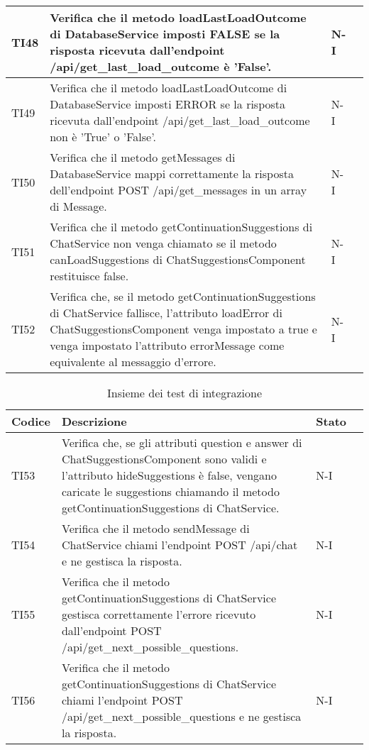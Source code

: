 \begin{table}[h!]
\begin{tabularx}{\textwidth}{|p{}|X|p{}|p{}|}
    TI48 & Verifica che il metodo loadLastLoadOutcome di DatabaseService imposti FALSE se la risposta ricevuta dall'endpoint /api/get\_last\_load\_outcome è 'False'. &  N-I \\ \hline
    TI49 & Verifica che il metodo loadLastLoadOutcome di DatabaseService imposti ERROR se la risposta ricevuta dall'endpoint /api/get\_last\_load\_outcome non è 'True' o 'False'. &  N-I \\ \hline
    TI50 & Verifica che il metodo getMessages di DatabaseService mappi correttamente la risposta dell'endpoint POST /api/get\_messages in un array di Message. &  N-I \\ \hline
    TI51 & Verifica che il metodo getContinuationSuggestions di ChatService non venga chiamato se il metodo canLoadSuggestions di ChatSuggestionsComponent restituisce false. &  N-I \\ \hline
    TI52 & Verifica che, se il metodo getContinuationSuggestions di ChatService fallisce, l'attributo loadError di ChatSuggestionsComponent venga impostato a true e venga impostato l'attributo errorMessage come equivalente al messaggio d'errore. &  N-I \\ \hline

    \end{tabularx}
\end{table}

\newpage

\begin{table}[h!]
    \centering
    \renewcommand{\arraystretch}{1.5}
    \begin{tabularx}{\textwidth}{|p{}|X|p{}|p{}|}\hline
    \rowcolor[HTML]{FFD700}
    \textbf{Codice} & \textbf{Descrizione} & \textbf{Stato} \\ \hline
    
    TI53 & Verifica che, se gli attributi question e answer di ChatSuggestionsComponent sono validi e l'attributo hideSuggestions è false, vengano caricate le suggestions chiamando il metodo getContinuationSuggestions di ChatService. &  N-I \\ \hline
    TI54 & Verifica che il metodo sendMessage di ChatService chiami l’endpoint POST /api/chat e ne gestisca la risposta. &  N-I \\ \hline
    TI55 & Verifica che il metodo getContinuationSuggestions di ChatService gestisca correttamente l'errore ricevuto dall'endpoint POST /api/get\_next\_possible\_questions. &  N-I \\ \hline
    TI56 & Verifica che il metodo getContinuationSuggestions di ChatService chiami l’endpoint POST /api/get\_next\_possible\_questions e ne gestisca la risposta. &  N-I \\ \hline

    \end{tabularx}
    \caption{Insieme dei test di integrazione}
\end{table}

